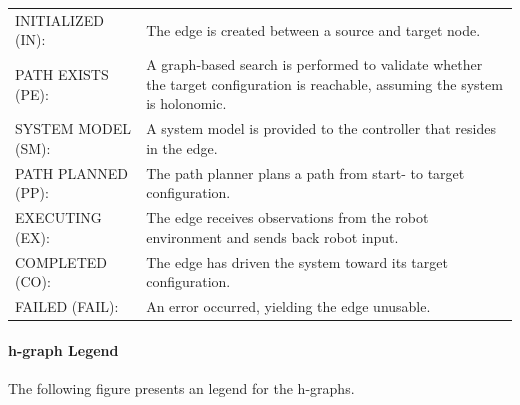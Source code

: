\noindent
\begin{table}[H]
\centering
\begin{tabular}%
  {>{\raggedleft\arraybackslash}p{}%
   >{\raggedright\arraybackslash}p{}}
INITIALIZED (IN): & The edge is created between a source and target node.\\
PATH EXISTS (PE): & A graph-based search is performed to validate whether the target configuration is reachable, assuming the system is holonomic. \\
SYSTEM MODEL (SM): & A system model is provided to the controller that resides in the edge.\\
PATH PLANNED (PP): & The path planner plans a path from start- to target configuration. \\
EXECUTING (EX): & The edge receives observations from the robot environment and sends back robot input. \\
COMPLETED (CO): & The edge has driven the system toward its target configuration. \\
FAILED (FAIL): & An error occurred, yielding the edge unusable. \\
\end{tabular}
\end{table}

\paragraph{\ac{h-graph} Legend}
The following figure presents an legend for the \ac{h-graph}s.\bs

